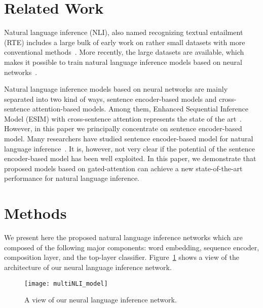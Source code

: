 \documentclass[11pt,letterpaper]{article}
\begin{document}
\section{Related Work}
Natural language inference (NLI), also named recognizing textual entailment (RTE) includes a large bulk of early work on rather small datasets with more conventional methods~\citep{Dagan2005ThePR,MacCartneyThesis}. More recently, the large datasets are available, which makes it possible to train natural language inference models based on neural networks~\citep{Bowman:D15-1075,DBLP:journals/corr/WilliamsNB17}. 

Natural language inference models based on neural networks are mainly separated into two kind of ways, sentence encoder-based models and cross-sentence attention-based models. Among them, Enhanced Sequential Inference Model (ESIM) with cross-sentence attention represents the state of the art~\citep{DBLP:journals/corr/ChenZLWJ16}. However, in this paper we principally concentrate on sentence encoder-based model. Many researchers have studied sentence encoder-based model for natural language inference~\citep{Bowman:D15-1075,DBLP:journals/corr/VendrovKFU15,Mou:P16-2022,Bowman:P16-1139,DBLP:journals/corr/MunkhdalaiY16,DBLP:journals/corr/MunkhdalaiY16b,DBLP:journals/corr/LiuSLW16,DBLP:journals/corr/LinFSYXZB17}. It is, however, not very clear if the potential of the sentence encoder-based model has been well exploited. In this paper, we demonstrate that proposed models based on gated-attention can achieve a new state-of-the-art performance for natural language inference. 

\section{Methods}

We present here the proposed natural language inference networks which are composed of the following major components: word embedding, sequence encoder, composition layer, and the top-layer classifier. 
Figure~\ref{fig:nli} shows a view of the architecture of our neural language inference network. 

\begin{figure}[!htb]
	\centering
	\texttt{[image: multiNLI\_model]}
	\caption{A view of our neural language inference network.}
    \vspace{-2mm}
	\label{fig:nli}
\end{figure}
\end{document}
